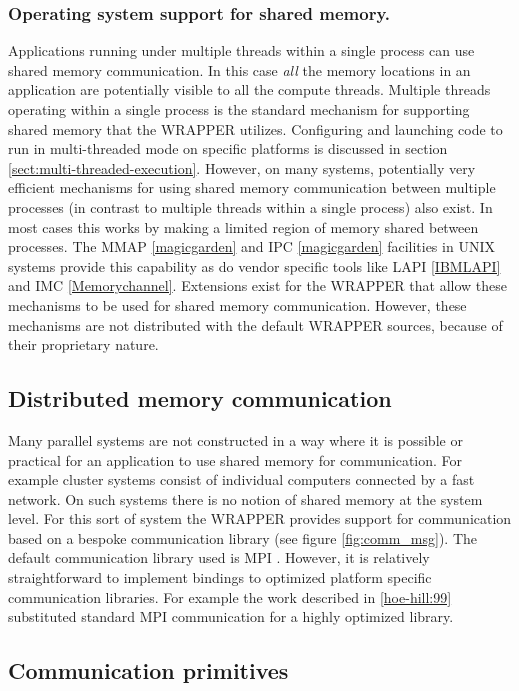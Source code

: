 \subsubsection{Operating system support for shared memory.}

Applications running under multiple threads within a single process
can use shared memory communication.  In this case {\it all} the
memory locations in an application are potentially visible to all the
compute threads. Multiple threads operating within a single process is
the standard mechanism for supporting shared memory that the WRAPPER
utilizes. Configuring and launching code to run in multi-threaded mode
on specific platforms is discussed in section
\ref{sect:multi-threaded-execution}.  However, on many systems,
potentially very efficient mechanisms for using shared memory
communication between multiple processes (in contrast to multiple
threads within a single process) also exist. In most cases this works
by making a limited region of memory shared between processes. The
MMAP \ref{magicgarden} and IPC \ref{magicgarden} facilities in UNIX
systems provide this capability as do vendor specific tools like LAPI
\ref{IBMLAPI} and IMC \ref{Memorychannel}.  Extensions exist for the
WRAPPER that allow these mechanisms to be used for shared memory
communication. However, these mechanisms are not distributed with the
default WRAPPER sources, because of their proprietary nature.

\subsection{Distributed memory communication}
\label{sect:distributed_memory_communication}
Many parallel systems are not constructed in a way where it is
possible or practical for an application to use shared memory for
communication. For example cluster systems consist of individual
computers connected by a fast network. On such systems there is no
notion of shared memory at the system level. For this sort of system
the WRAPPER provides support for communication based on a bespoke
communication library (see figure \ref{fig:comm_msg}).  The default
communication library used is MPI \cite{MPI-std-20}. However, it is
relatively straightforward to implement bindings to optimized platform
specific communication libraries. For example the work described in
\ref{hoe-hill:99} substituted standard MPI communication for a highly
optimized library.

\subsection{Communication primitives}
\label{sect:communication_primitives}

